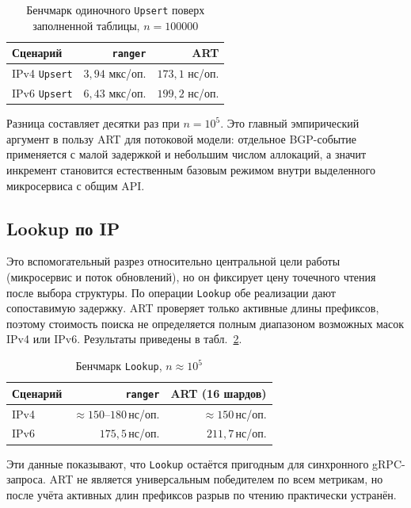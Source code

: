 \begin{table}[ht]
\centering
\caption{Бенчмарк одиночного \texttt{Upsert} поверх заполненной
таблицы, $n=100000$}
\label{tab:bench-upsert}
\small
\begin{tabular}{lrr}
\toprule
Сценарий & \texttt{ranger} & ART \\
\midrule
IPv4 \texttt{Upsert} & $3{,}94$ мкс/оп. & $173{,}1$ нс/оп. \\
IPv6 \texttt{Upsert} & $6{,}43$ мкс/оп. & $199{,}2$ нс/оп. \\
\bottomrule
\end{tabular}
\end{table}

Разница составляет десятки раз при $n=10^5$. Это главный эмпирический
аргумент в пользу ART для потоковой модели: отдельное BGP-событие
применяется с малой задержкой и небольшим числом аллокаций, а значит
инкремент становится естественным базовым режимом внутри выделенного
микросервиса с общим API.

\subsection{Lookup по IP}

Это вспомогательный разрез относительно центральной цели работы
(микросервис и поток обновлений), но он фиксирует цену точечного чтения
после выбора структуры. По операции \texttt{Lookup} обе реализации дают
сопоставимую задержку. ART проверяет только активные длины префиксов,
поэтому стоимость поиска не определяется полным диапазоном возможных
масок IPv4 или IPv6. Результаты приведены в табл.~\ref{tab:bench-lookup}.

\begin{table}[ht]
\centering
\caption{Бенчмарк \texttt{Lookup}, $n \approx 10^5$}
\label{tab:bench-lookup}
\small
\begin{tabular}{lrr}
\toprule
Сценарий       & \texttt{ranger}       & ART (16 шардов) \\
\midrule
IPv4 & $\approx 150$--$180\,$нс/оп. & $\approx 150\,$нс/оп. \\
IPv6 & $175{,}5\,$нс/оп. & $211{,}7\,$нс/оп. \\
\bottomrule
\end{tabular}
\end{table}

Эти данные показывают, что \texttt{Lookup} остаётся пригодным для
синхронного gRPC-запроса. ART не является универсальным победителем по
всем метрикам, но после учёта активных длин префиксов разрыв по чтению
практически устранён.

